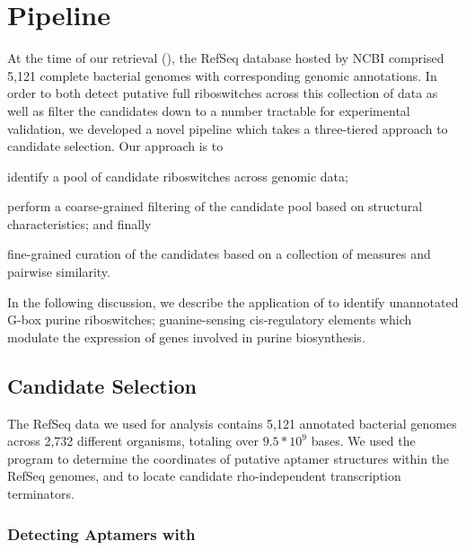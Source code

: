 \section{Pipeline} \label{sec:pipeline}

At the time of our retrieval (\fnaRetrievalTime), the RefSeq database hosted by NCBI comprised 5,121 complete bacterial genomes with corresponding genomic annotations. In order to both detect putative full riboswitches across this collection of data as well as filter the candidates down to a number tractable for experimental validation, we developed a novel pipeline which takes a three-tiered approach to candidate selection. Our approach is to \begin{inparaenum}
\item identify a pool of candidate riboswitches across genomic data;
\item perform a coarse-grained filtering of the candidate pool based on structural characteristics; and finally
\item fine-grained curation of the candidates based on a collection of measures and pairwise similarity.
\end{inparaenum}

In the following discussion, we describe the application of \rfinder to identify unannotated G-box purine riboswitches; guanine-sensing cis-regulatory elements which modulate the expression of genes involved in purine biosynthesis.

\subsection{Candidate Selection} \label{sub:candidates}

The RefSeq data we used for analysis contains 5,121 annotated bacterial genomes across 2,732 different organisms, totaling over $9.5 * 10^9$ bases. We used the program \infernal to determine the coordinates of putative aptamer structures within the RefSeq genomes, and \tthp to locate candidate rho-independent transcription terminators.

\subsubsection{Detecting Aptamers with \infernal} \label{ssub:infernal}

